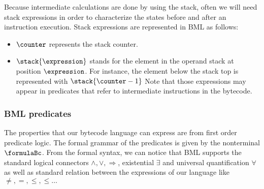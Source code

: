 Because intermediate calculations are done by using the stack, often we will need stack expressions in order to characterize the states before and after an instruction
execution. Stack expressions are represented in BML as follows:
\begin{itemize}
      \item  $\counter$ represents the stack counter.
      \item  $\stack{ \expression}$ stands for the element in the operand stack at position $\expression$.   
             For instance, the element below the stack top is represented with $\stack{\counter - 1}$ 
             Note that those expressions may appear in predicates that refer to intermediate instructions in the bytecode. 
           
 \end{itemize}


%
% 
%

\subsubsection{BML predicates}
 The properties that our bytecode language can express are from first order predicate logic. The formal grammar of the predicates is
 given by the nonterminal $\formulaBc$. From the formal syntax, we can notice that BML supports the standard logical connectors
 $\wedge, \vee, \Rightarrow $, existential $\exists$ and universal quantification $\forall$ as well as standard relation between
 the  expressions of our language like $\neq, = , \leq, \le \ldots$  
 

